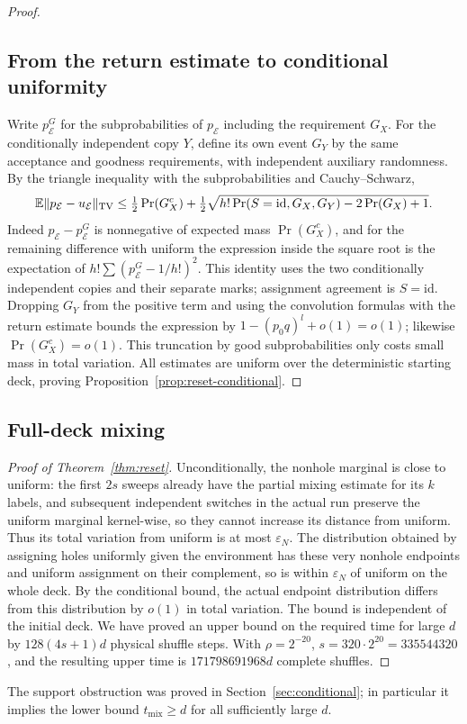 \begin{proof}
\subsection{From the return estimate to conditional uniformity} Write \(p_{\mathcal E}^G\) for the subprobabilities of \(p_{\mathcal E}\) including the requirement \(G_X\). For the conditionally independent copy \(Y\), define its own event \(G_Y\) by the same acceptance and goodness requirements, with independent auxiliary randomness. By the triangle inequality with the subprobabilities and Cauchy--Schwarz,
\[
\mathbb E\|p_{\mathcal E}-u_{\mathcal E}\|_{\rm TV}
\le \tfrac12\Pr(G_X^c)
+\tfrac12\sqrt{h!\Pr(S=\mathrm{id},G_X,G_Y)-2\Pr(G_X)+1}.
\]
Indeed \(p_{\mathcal E}-p_{\mathcal E}^G\) is nonnegative of expected mass \(\Pr(G_X^c)\), and for the remaining difference with uniform the expression inside the square root is the expectation of \(h!\sum(p_{\mathcal E}^G-1/h!)^2\). This identity uses the two conditionally independent copies and their separate marks; assignment agreement is \(S=\mathrm{id}\). Dropping \(G_Y\) from the positive term and using the convolution formulas with the return estimate bounds the expression by \(1-(p_0q)^l+o(1)=o(1)\); likewise \(\Pr(G_X^c)=o(1)\). This truncation by good subprobabilities only costs small mass in total variation. All estimates are uniform over the deterministic starting deck, proving Proposition~\ref{prop:reset-conditional}.
\end{proof}

\subsection{Full-deck mixing}
\begin{proof}[Proof of Theorem~\ref{thm:reset}]
\label{special:reset:bound}
Unconditionally, the nonhole marginal is close to uniform: the first \(2s\) sweeps already have the partial mixing estimate for its \(k\) labels, and subsequent independent switches in the actual run preserve the uniform marginal kernel-wise, so they cannot increase its distance from uniform. Thus its total variation from uniform is at most \(\varepsilon_N\). The distribution obtained by assigning holes uniformly given the environment has these very nonhole endpoints and uniform assignment on their complement, so is within \(\varepsilon_N\) of uniform on the whole deck. By the conditional bound, the actual endpoint distribution differs from this distribution by \(o(1)\) in total variation. The bound is independent of the initial deck. We have proved an upper bound on the required time for large \(d\) by \(128(4s+1)d\) physical shuffle steps.
With $\rho=2^{-20}$, $s=320\cdot2^{20}=335544320$, and the resulting upper time is $171798691968d$ complete shuffles.

\end{proof}

The support obstruction was proved in Section~\ref{sec:conditional}; in particular it implies the lower bound $t_{\mathrm{mix}}\ge d$ for all sufficiently large $d$.
